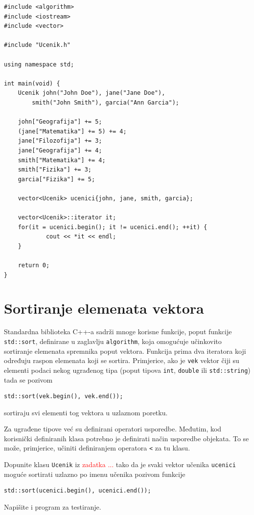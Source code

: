 \begin{verbatim}
#include <algorithm>
#include <iostream>
#include <vector>

#include "Ucenik.h"

using namespace std;

int main(void) {
    Ucenik john("John Doe"), jane("Jane Doe"),
        smith("John Smith"), garcia("Ann Garcia");

    john["Geografija"] += 5;
    (jane["Matematika"] += 5) += 4;
    jane["Filozofija"] += 3;
    jane["Geografija"] += 4;
    smith["Matematika"] += 4;
    smith["Fizika"] += 3;
    garcia["Fizika"] += 5;

    vector<Ucenik> ucenici{john, jane, smith, garcia};

    vector<Ucenik>::iterator it;
    for(it = ucenici.begin(); it != ucenici.end(); ++it) {
            cout << *it << endl;
    }

    return 0;
}
\end{verbatim}


\section{Sortiranje elemenata vektora}

Standardna biblioteka C++-a sadrži mnoge korisne funkcije,
poput funkcije \texttt{std::sort}, definirane u zaglavlju 
\texttt{algorithm}, 
koja omogućuje učinkovito sortiranje elemenata spremnika poput vektora. 
Funkcija prima dva iteratora koji određuju raspon elemenata koji se sortira. Primjerice,
ako je \texttt{vek} vektor čiji su elementi podaci nekog ugrađenog tipa
(poput tipova \texttt{int}, \texttt{double} ili \texttt{std::string})
tada se pozivom
\begin{verbatim}
std::sort(vek.begin(), vek.end());
\end{verbatim}
sortiraju svi elementi tog vektora u uzlaznom poretku.
\medskip 

Za ugrađene tipove već su definirani operatori usporedbe. 
Međutim, kod korisnički definiranih klasa potrebno je 
definirati način usporedbe objekata.
To se može, primjerice, učiniti definiranjem operatora \texttt{<} za tu klasu.

\begin{zadatak}\label{zad:sortiranje-operator}
Dopunite klasu \texttt{Ucenik} iz \textcolor{red}{zadatka ...}
tako da je svaki vektor učenika \texttt{ucenici} moguće sortirati uzlazno po imenu učenika
pozivom funkcije
\begin{verbatim}   
std::sort(ucenici.begin(), ucenici.end());
\end{verbatim}
Napišite i program za testiranje.
\end{zadatak}


